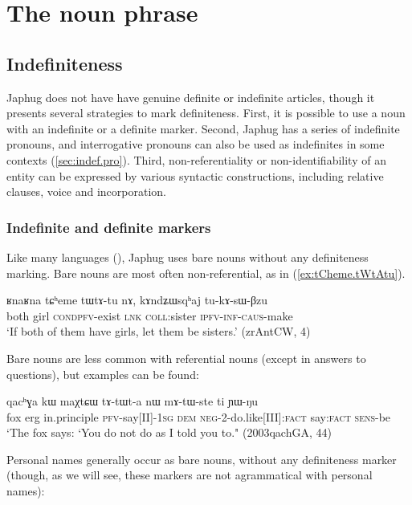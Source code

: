\chapter{The noun phrase}
\section{Indefiniteness} \label{sec:indef}
Japhug does not have have genuine definite or indefinite articles, though it presents several strategies to mark definiteness. First, it is possible to use a noun with an indefinite or a definite marker. Second, Japhug has a series of indefinite pronouns, and interrogative pronouns can also be used as indefinites in some contexts (\ref{sec:indef.pro}). Third, non-referentiality or non-identifiability of an entity can be expressed by various syntactic constructions, including relative clauses, voice and incorporation.

\subsection{Indefinite and definite markers}
Like many languages (\citealt[130]{creissels06sgit1}), Japhug  uses bare nouns without any definiteness marking. Bare nouns are most often non-referential, as  in (\ref{ex:tCheme.tWtAtu}).

\begin{exe}
\ex \label{ex:tCheme.tWtAtu}
\gll ʁnaʁna tɕʰeme tɯ\redp{}tɤ-tu nɤ, kɤndʑɯsqʰaj 	tu-kɤ-sɯ-βzu \\
both girl \textsc{cond}\redp{}\textsc{pfv}-exist \textsc{lnk} \textsc{coll}:sister \textsc{ipfv}-\textsc{inf}-\textsc{caus}-make \\
\glt `If both of them have girls, let them be sisters.' (zrAntCW, 4)
\end{exe}


Bare nouns are less common with referential nouns (except in answers to questions), but examples can be found:

\begin{exe}
\ex
\gll qacʰɣa 	kɯ 	maχtɕɯ tɤ-tɯt-a nɯ mɤ-tɯ-ste 	ti 	ɲɯ-ŋu  \\
fox erg in.principle \textsc{pfv}-say[II]-\textsc{1sg} \textsc{dem} \textsc{neg}-2-do.like[III]:\textsc{fact} say:\textsc{fact} \textsc{sens}-be \\
\glt `The fox says: `You do not do as I told you to." (2003qachGA, 44)
\end{exe}

Personal names generally occur as bare nouns, without any definiteness marker (though, as we will see, these markers are not agrammatical with personal names):

